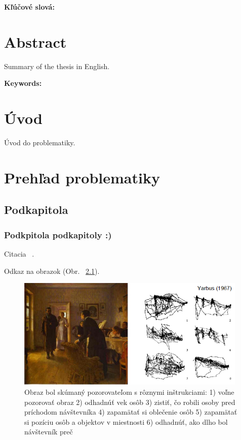 \documentclass[12pt,oneside,a4paper]{book}
\begin{document}
\textbf{Kľúčové slová:}

\chapter*{Abstract}
Summary of the thesis in English.

\textbf{Keywords:}


\tableofcontents
\listoffigures
\listoftables

\mainmatter

\chapter{Úvod}
Úvod do problematiky.


\chapter{Prehľad problematiky}
\section{Podkapitola}

\subsection{Podkpitola podkapitoly :) }

Citacia ~\cite{Itti1998}.

Odkaz na obrazok (Obr. ~\ref{fig:yarbus}).

\begin{figure}
  \centering
    \includegraphics[width=11cm]{images/Yarbus.png}
    \caption[Kratky popis obrazka]{Obraz bol skúmaný pozorovateľom s rôznymi inštrukciami: 1) voľne pozorovať obraz 2) odhadnúť vek osôb 3) zistiť, čo robili osoby pred príchodom návštevníka 4) zapamätať si oblečenie osôb 5) zapamätať si pozíciu osôb a objektov v miestnosti  6) odhadnúť, ako dlho bol návštevník preč~\cite{Cater2003}}
  \label{fig:yarbus}
\end{figure}
\end{document}
